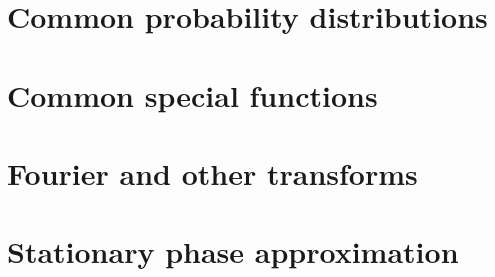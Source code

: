 \documentclass[12pt]{report}
\theoremstyle{definition}
\begin{document}
\chapter{Common probability distributions}
\label{chap:probability-distributions}


\chapter{Common special functions}
\label{chap:special-functions}


\chapter{Fourier and other transforms}
\label{chap:fourier-transforms}


\chapter{Stationary phase approximation}
\label{chap:stationary-phase}


\cleardoublepage 
  
\end{document}
